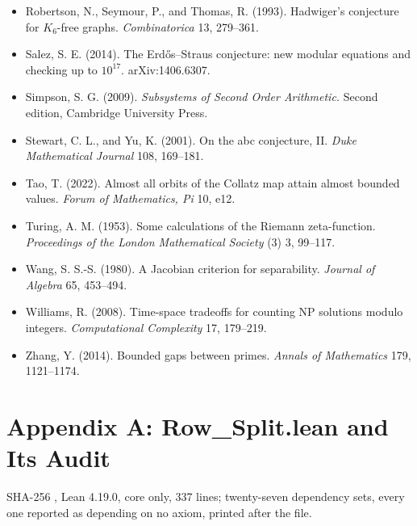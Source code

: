 \documentclass[10pt]{article}
\begin{document}
\begin{itemize}
  \(2996863034895 \cdot 2^{1290000} \pm 1\). primegrid.com, September
  2016.
\item
  Robertson, N., Seymour, P., and Thomas, R. (1993). Hadwiger's
  conjecture for \(K_6\)-free graphs. \emph{Combinatorica} 13, 279--361.
\item
  Salez, S. E. (2014). The Erdős--Straus conjecture: new modular
  equations and checking up to \(10^{17}\). arXiv:1406.6307.
\item
  Simpson, S. G. (2009). \emph{Subsystems of Second Order Arithmetic.}
  Second edition, Cambridge University Press.
\item
  Stewart, C. L., and Yu, K. (2001). On the abc conjecture, II.
  \emph{Duke Mathematical Journal} 108, 169--181.
\item
  Tao, T. (2022). Almost all orbits of the Collatz map attain almost
  bounded values. \emph{Forum of Mathematics, Pi} 10, e12.
\item
  Turing, A. M. (1953). Some calculations of the Riemann zeta-function.
  \emph{Proceedings of the London Mathematical Society} (3) 3, 99--117.
\item
  Wang, S. S.-S. (1980). A Jacobian criterion for separability.
  \emph{Journal of Algebra} 65, 453--494.
\item
  Williams, R. (2008). Time-space tradeoffs for counting NP solutions
  modulo integers. \emph{Computational Complexity} 17, 179--219.
\item
  Zhang, Y. (2014). Bounded gaps between primes. \emph{Annals of
  Mathematics} 179, 1121--1174.
\end{itemize}

\hypertarget{appendix-a-row_split.lean-and-its-audit}{%
\twocolumn
\section{Appendix A: Row\_Split.lean and Its
Audit}\label{appendix-a-row_split.lean-and-its-audit}}

SHA-256
\texttt{},
Lean 4.19.0, core only, 337 lines; twenty-seven dependency sets, every
one reported as depending on no axiom, printed after the file.

\begingroup\scriptsize
\end{document}
